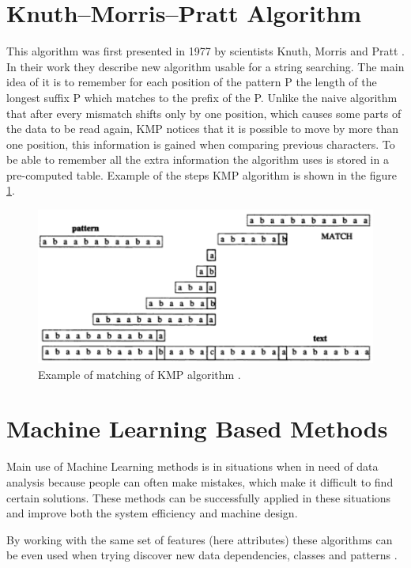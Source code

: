 \section{Knuth--Morris--Pratt Algorithm}\label{KMP}
This algorithm was first presented in 1977 by scientists Knuth, Morris and Pratt \cite{kmp}. In their work they describe new algorithm usable for a string searching. The main idea of it is to remember for each position of the pattern P the length of the longest suffix P which matches to the prefix of the P. Unlike the naive algorithm that after every mismatch shifts only by one position, which causes some parts of the data to be read again, KMP notices that it is possible to 
move by more than one position, this information is gained when comparing previous characters. To be able to remember all the extra information the algorithm uses is stored in a pre-computed table. Example of the steps KMP algorithm is shown in the figure \ref{kmp}.

\begin{figure}
\centering
\includegraphics[scale=0.4]{KMP}
\caption{Example of matching of KMP algorithm \cite{stringJewels}. }
\label{kmp}
\end{figure}

\section{Machine Learning Based Methods}\label{machineLearning}
Main use of Machine Learning methods is in situations when in need of data analysis because people can often make mistakes, which make it difficult to find certain solutions.
These methods can be successfully applied in these situations and improve both the system efficiency and machine design. 

By working with the same set of features (here attributes) these algorithms can be even used when trying discover new data dependencies, classes and patterns \cite{mlbm}.

